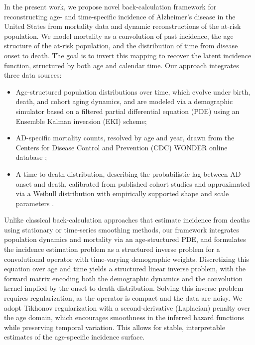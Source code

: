 \documentclass{article}
\begin{document}
In the present work, we propose novel back-calculation framework for reconstructing age- and time-specific incidence of Alzheimer’s disease in the United States from mortality data and dynamic reconstructions of the at-risk population. We model mortality as a convolution of past incidence, the age structure of the at-risk population, and the distribution of time from disease onset to death. The goal is to invert this mapping to recover the latent incidence function, structured by both age and calendar time. Our approach integrates three data sources:
\begin{itemize}
    \item Age-structured population distributions over time, which evolve under birth, death, and cohort aging dynamics, and are modeled via a demographic simulator based on a filtered partial differential equation (PDE)  using an Ensemble Kalman inversion (EKI) scheme;
\item AD-specific mortality counts, resolved by age and year, drawn from the Centers for Disease Control and Prevention (CDC) WONDER online database \cite{cdc_wonder};
\item A time-to-death distribution, describing the probabilistic lag between AD onset and death, calibrated from published cohort studies and approximated via a Weibull distribution with empirically supported shape and scale parameters \cite{joling2020time}.
\end{itemize}



Unlike classical back-calculation approaches that estimate incidence from deaths using stationary or time-series smoothing methods, our framework integrates population dynamics and mortality via an age-structured PDE, and formulates the incidence estimation problem as a structured inverse problem for a convolutional operator with time-varying demographic weights. Discretizing this equation over age and time yields a structured linear inverse problem, with the forward matrix encoding both the demographic dynamics and the convolution kernel implied by the onset-to-death distribution. Solving this inverse problem requires regularization, as the operator is compact and the data are noisy. We adopt Tikhonov regularization \cite{tikhonov} with a second-derivative (Laplacian) penalty over the age domain, which encourages smoothness in the inferred hazard functions while preserving temporal variation. This allows for stable, interpretable estimates of the age-specific incidence surface.
\end{document}
